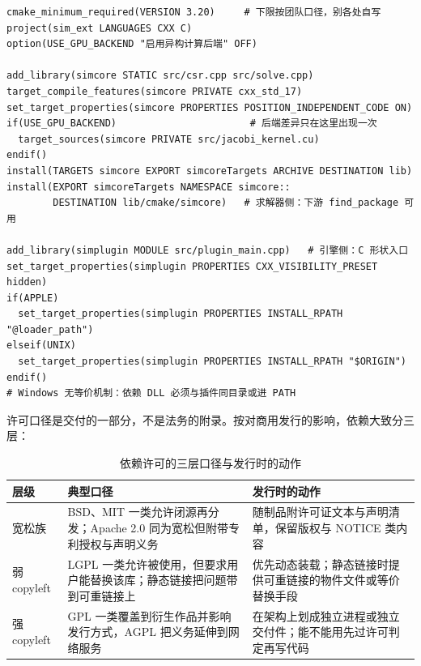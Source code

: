 \documentclass[12pt,a4paper,fontset=fandol]{ctexbook}
\begin{document}
\begin{lstlisting}[language=CMakeLD, style=cmakestyle,
  caption={一份构建脚本同时出求解器库与引擎插件（形状示意）},
  label={lst:ch17-cmake}]
cmake_minimum_required(VERSION 3.20)     # 下限按团队口径，别各处自写
project(sim_ext LANGUAGES CXX C)
option(USE_GPU_BACKEND "启用异构计算后端" OFF)

add_library(simcore STATIC src/csr.cpp src/solve.cpp)
target_compile_features(simcore PRIVATE cxx_std_17)
set_target_properties(simcore PROPERTIES POSITION_INDEPENDENT_CODE ON)
if(USE_GPU_BACKEND)                       # 后端差异只在这里出现一次
  target_sources(simcore PRIVATE src/jacobi_kernel.cu)
endif()
install(TARGETS simcore EXPORT simcoreTargets ARCHIVE DESTINATION lib)
install(EXPORT simcoreTargets NAMESPACE simcore::
        DESTINATION lib/cmake/simcore)   # 求解器侧：下游 find_package 可用

add_library(simplugin MODULE src/plugin_main.cpp)   # 引擎侧：C 形状入口
set_target_properties(simplugin PROPERTIES CXX_VISIBILITY_PRESET hidden)
if(APPLE)
  set_target_properties(simplugin PROPERTIES INSTALL_RPATH "@loader_path")
elseif(UNIX)
  set_target_properties(simplugin PROPERTIES INSTALL_RPATH "$ORIGIN")
endif()
# Windows 无等价机制：依赖 DLL 必须与插件同目录或进 PATH
\end{lstlisting}

许可口径是交付的一部分，不是法务的附录。按对商用发行的影响，依赖大致分三层：

\begin{table}[htbp]
\centering
\caption{依赖许可的三层口径与发行时的动作}
\label{tab:ch17-license}
\begin{tabular}{>{\raggedright\arraybackslash}p{}
                >{\raggedright\arraybackslash}p{}
                >{\raggedright\arraybackslash}p{}}
\toprule
\textbf{层级} & \textbf{典型口径} & \textbf{发行时的动作} \\
\midrule
宽松族 & BSD、MIT 一类允许闭源再分发；Apache 2.0 同为宽松但附带专利授权与声明义务 & 随制品附许可证文本与声明清单，保留版权与 NOTICE 类内容 \\
弱 copyleft & LGPL 一类允许被使用，但要求用户能替换该库；静态链接把问题带到可重链接上 & 优先动态装载；静态链接时提供可重链接的物件文件或等价替换手段 \\
强 copyleft & GPL 一类覆盖到衍生作品并影响发行方式，AGPL 把义务延伸到网络服务 & 在架构上划成独立进程或独立交付件；能不能用先过许可判定再写代码 \\
\bottomrule
\end{tabular}
\end{table}
\end{document}
